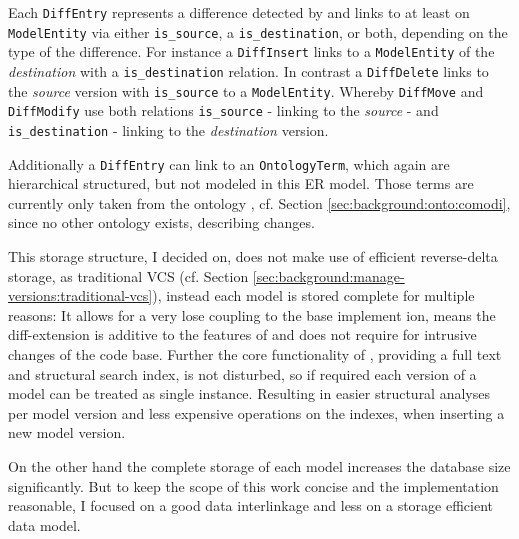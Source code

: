 Each \texttt{DiffEntry} represents a difference detected by \bives \cite{Scharm2015} and links to at least on \texttt{ModelEntity} via either \texttt{is\_source}, a \texttt{is\_destination}, or both, depending on the type of the difference.
For instance a \texttt{DiffInsert} links to a \texttt{ModelEntity} of the \emph{destination} with a \texttt{is\_destination} relation.
In contrast a \texttt{DiffDelete} links to the \emph{source} version with \texttt{is\_source} to a \texttt{ModelEntity}. Whereby \texttt{DiffMove} and \texttt{DiffModify} use both relations \texttt{is\_source} - linking to the \emph{source} - and \texttt{is\_destination} - linking to the \emph{destination} version.

Additionally a \texttt{DiffEntry} can link to an \texttt{OntologyTerm}, which again are hierarchical structured, but not modeled in this ER model. Those terms are currently only taken from the \comodi ontology \cite{Scharm2016}, cf. Section \ref{sec:background:onto:comodi}, since no other ontology exists, describing changes.


This storage structure, I decided on, does not make use of efficient reverse-delta storage, as traditional VCS (cf. Section \ref{sec:background:manage-versions:traditional-vcs}), instead each model is stored complete for multiple reasons: It allows for a very lose coupling to the base \masymos implement ion, means the diff-extension is additive to the features of \masymos and does not require for intrusive changes of the code base. Further the core functionality of \masymos, providing a full text and structural search index, is not disturbed, so if required each version of a model can be treated as single instance. Resulting in easier structural analyses per model version and less expensive operations on the indexes, when inserting a new model version.

On the other hand the complete storage of each model increases the database size significantly. But to keep the scope of this work concise and the implementation reasonable, I focused on a good data interlinkage and less on a storage efficient data model. 

